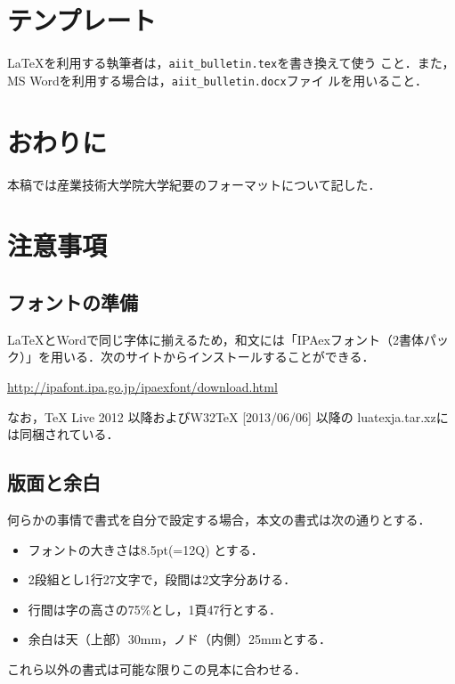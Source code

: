 \documentclass[a4j, 12Q, twocolumn, twoside]{jsarticle}
\begin{document}
\section{テンプレート}
\LaTeX を利用する執筆者は，\texttt{aiit\_bulletin.tex}を書き換えて使う
こと．また，MS Wordを利用する場合は，\texttt{aiit\_bulletin.docx}ファイ
ルを用いること．

\section{おわりに}
本稿では産業技術大学院大学紀要のフォーマットについて記した．




\appendix
\section{注意事項}
\subsection{フォントの準備}
LaTeXとWordで同じ字体に揃えるため，和文には「IPAexフォント（2書体パッ
ク）」を用いる．次のサイトからインストールすることができる．

\url{http://ipafont.ipa.go.jp/ipaexfont/download.html}

なお，TeX Live 2012 以降およびW32TeX [2013/06/06] 以降の
luatexja.tar.xzに は同梱されている．

\subsection{版面と余白}
何らかの事情で書式を自分で設定する場合，本文の書式は次の通りとする．

\begin{itemize}
 \item フォントの大きさは8.5pt(=12Q) とする．
 \item 2段組とし1行27文字で，段間は2文字分あける．
 \item 行間は字の高さの75\%とし，1頁47行とする．
 \item 余白は天（上部）30mm，ノド（内側）25mmとする．
\end{itemize}

これら以外の書式は可能な限りこの見本に合わせる．
\end{document}

